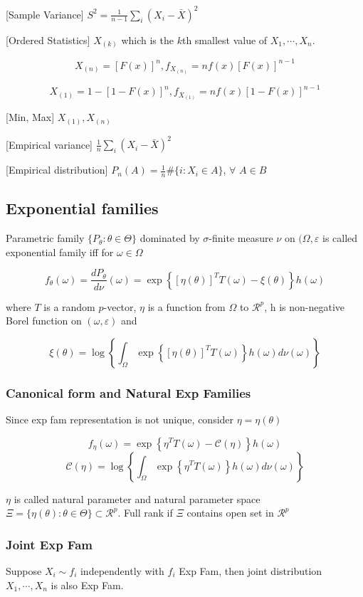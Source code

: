 [Sample Variance] $S^2=\frac{1}{n-1}\sum_i(X_i-\bar{X})^2$

[Ordered Statistics] $X_(k)$ which is the $k$th smallest value of $X_1, \cdots, X_n$.

$$X_{(n)}=[F(x)]^n, f_{X_{(n)}}=nf(x)[F(x)]^{n-1}$$

$$X_{(1)}=1-[1-F(x)]^n, f_{X_{(1)}}=nf(x)[1-F(x)]^{n-1}$$

[Min, Max] $X_{(1)}, X_{(n)}$

[Empirical variance] $\frac{1}{n}\sum_i (X_i - \bar{X})^2$

[Empirical distribution] $P_n(A)=\frac{1}{n}\#\{i: X_i \in A\}$, $\forall$ $A\in B$

\subsection{Exponential families}
Parametric family $\{P_\theta:\theta\in\Theta\}$ dominated by $\sigma$-finite measure $\nu$ on $(\Omega, \varepsilon$ is called exponential family iff for $\omega\in\Omega$

$$
f_{\theta}(\omega)=\frac{dP_\theta}{d\nu}(\omega) = \exp\left\{[\eta(\theta)]^T T(\omega)-\xi(\theta)\right\}h(\omega)
$$

where $T$ is a random $p$-vector, $\eta$ is a function from $\Omega$ to $\mathcal{R}^p$, h is non-negative Borel function on $(\omega, \varepsilon)$ and 

$$
\xi(\theta) =\log\left\{\int_\Omega \exp\left\{[\eta(\theta)]^T T(\omega)\right\}h(\omega) d\nu(\omega)\right\}
$$

\subsubsection{Canonical form and Natural Exp Families}

Since exp fam representation is not unique, consider $\eta=\eta(\theta)$

$$
f_\eta(\omega) = \exp\left\{\eta^T T(\omega)-\mathcal{C}(\eta)\right\}h(\omega)
$$
$$\mathcal{C}(\eta)=\log\left\{\int_\Omega \exp\left\{\eta^T T(\omega)\right\}h(\omega)d\nu(\omega)\right\}$$

$\eta$ is called natural parameter and natural parameter space $\Xi=\{\eta(\theta):\theta\in\Theta\}\subset\mathcal{R}^p$. Full rank if $\Xi$ contains open set in $\mathcal{R}^p$

\subsubsection{Joint Exp Fam}
Suppose $X_i\sim f_i$ independently with $f_i$ Exp Fam, then joint distribution $X_1, \cdots, X_n$ is also Exp Fam.

